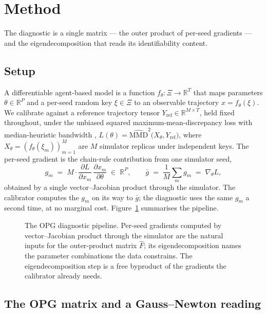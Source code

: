 \section{Method}
\label{sec:method}

The diagnostic is a single matrix --- the outer product of per-seed
gradients --- and the eigendecomposition that reads its identifiability
content.

\subsection{Setup}
\label{sec:method:setup}

A differentiable agent-based model is a function
$f_\theta : \Xi \to \mathbb{R}^T$ that maps parameters
$\theta \in \mathbb{R}^P$ and a per-seed random key $\xi \in \Xi$ to
an observable trajectory $x = f_\theta(\xi)$. We calibrate against a
reference trajectory tensor $Y_{\mathrm{ref}} \in \mathbb{R}^{M \times T}$,
held fixed throughout, under the unbiased squared maximum-mean-discrepancy
loss with median-heuristic bandwidth \citep{gretton_mmd_2012},
$L(\theta) = \widehat{\mathrm{MMD}}^2\!\bigl(X_\theta, Y_{\mathrm{ref}}\bigr)$,
where $X_\theta = (f_\theta(\xi_m))_{m=1}^{M}$ are $M$ simulator
replicas under independent keys. The per-seed gradient is the
chain-rule contribution from one simulator seed,
\begin{equation}
\label{eq:gm}
g_m \;=\; M \cdot \frac{\partial L}{\partial x_m}\,\frac{\partial x_m}{\partial \theta}
\;\in\; \mathbb{R}^{P},
\qquad
\bar g \;=\; \frac{1}{M}\sum_m g_m \;=\; \nabla_\theta L,
\end{equation}
obtained by a single vector--Jacobian product through the simulator.
The calibrator computes the $g_m$ on its way to $\bar g$; the
diagnostic uses the same $g_m$ a second time, at no marginal cost.
Figure~\ref{fig:method} summarises the pipeline.

\begin{figure}[t]
  \centering
  
  \caption{The OPG diagnostic pipeline. Per-seed gradients computed by vector--Jacobian product through the simulator are the natural inputs for the outer-product matrix $\widehat F$; its eigendecomposition names the parameter combinations the data constrains. The eigendecomposition step is a free byproduct of the gradients the calibrator already needs.}
  \label{fig:method}
\end{figure}

\subsection{The OPG matrix and a Gauss--Newton reading}
\label{sec:method:opg}


